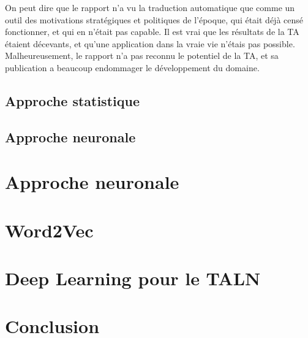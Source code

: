 \documentclass[11pt,a4paper]{report}
\begin{document}
  On peut dire que le rapport n'a vu la traduction automatique que comme un outil des 
  motivations stratégiques et politiques de l'époque, qui était 
  déjà censé fonctionner, et qui en n'était pas capable. Il est vrai que les résultats 
  de la TA étaient décevants, et qu'une application dans la vraie vie n'étais pas possible. 
  Malheureusement, le rapport n'a pas reconnu le potentiel de la TA, et sa publication 
  a beaucoup endommager le développement du domaine.   

  \section*{Approche statistique}
  \section*{Approche neuronale}

\chapter{Approche neuronale}
\chapter{Word2Vec}
\chapter{Deep Learning pour le TALN}
\chapter{Conclusion}



\end{document}
